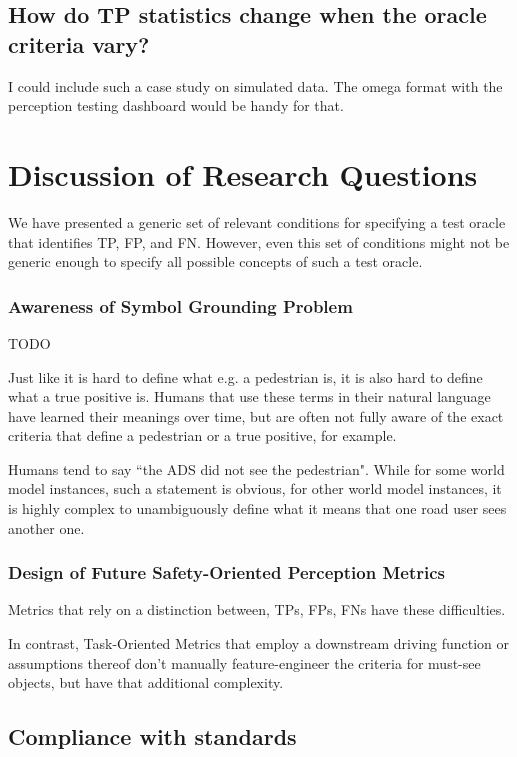\documentclass[conference]{IEEEtran}
\begin{document}
\subsection{How do TP statistics change when the oracle criteria vary?}

I could include such a case study on simulated data. The omega format with the perception testing dashboard would be handy for that.


\section{Discussion of Research Questions}
\label{sec:discussion}

We have presented a generic set of relevant conditions for specifying a test oracle that identifies TP, FP, and FN. 
However, even this set of conditions might not be generic enough to specify all possible concepts of such a test oracle. 


\subsubsection{Awareness of Symbol Grounding Problem}

TODO

Just like it is hard to define what e.g. a pedestrian is, it is also hard to define what a true positive is. 
Humans that use these terms in their natural language have learned their meanings over time, but are often not fully aware of the exact criteria that define a pedestrian or a true positive, for example.  

Humans tend to say ``the ADS did not see the pedestrian". While for some world model instances, such a statement is obvious, for other world model instances, it is highly complex to unambiguously define what it means that one road user sees another one. 


\subsubsection{Design of Future Safety-Oriented Perception Metrics}

Metrics that rely on a distinction between, TPs, FPs, FNs have these difficulties. 

In contrast, Task-Oriented Metrics that employ a downstream driving function or assumptions thereof don't manually feature-engineer the criteria for must-see objects, but have that additional complexity. 


\subsection{Compliance with standards}
\end{document}
